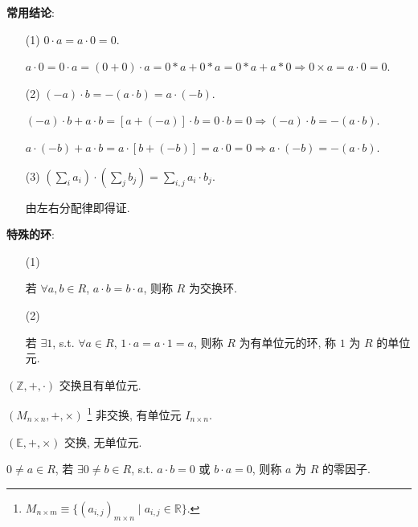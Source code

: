 \documentclass{note}
\begin{document}
\textbf{常用结论}:
\begin{itemize}
    \item[(1)] $0\cdot a=a\cdot 0=0$.
    \begin{pf}
        $a\cdot 0=0\cdot a=(0+0)\cdot a=0*a+0*a=0*a+a*0\Longrightarrow 0\times a=a\cdot 0=0$.
    \end{pf}
    \item[(2)] $(-a)\cdot b=-(a\cdot b)=a\cdot(-b)$.
    \begin{pf}
        $(-a)\cdot b+a\cdot b=[a+(-a)]\cdot b=0\cdot b=0\Longrightarrow (-a)\cdot b=-(a\cdot b)$.

        $a\cdot(-b)+a\cdot b=a\cdot[b+(-b)]=a\cdot 0=0\Longrightarrow a\cdot(-b)=-(a\cdot b)$.
    \end{pf}
    \item[(3)] $\left(\sum_ia_i\right)\cdot\left(\sum_jb_j\right)=\sum_{i,j}a_i\cdot b_j$.
    \begin{pf}
        由左右分配律即得证.
    \end{pf}
\end{itemize}

\textbf{特殊的环}:
\begin{itemize}
    \item[(1)] ~\begin{df}[交换环]
        若 $\forall a,b\in R$, $a\cdot b=b\cdot a$, 则称 $R$ 为交换环.
    \end{df}
    \item[(2)] ~\begin{df}[有单位元的环]
        若 $\exists 1$, s.t. $\forall a\in R$, $1\cdot a=a\cdot 1=a$, 则称 $R$ 为有单位元的环, 称 $1$ 为 $R$ 的单位元.
    \end{df}
\end{itemize}

\begin{eg}
    $(\mathbb{Z},+,\cdot)$ 交换且有单位元.
\end{eg}

\begin{eg}
    $(M_{n\times n},+,\times)$ \footnote{$M_{n\times m}\equiv\{(a_{i,j})_{m\times n}\mid a_{i,j}\in\mathbb{R}\}$.} 非交换, 有单位元 $I_{n\times n}$.
\end{eg}

\begin{eg}
    $(\mathbb{E},+,\times)$ 交换, 无单位元.
\end{eg}

\begin{df}[零因子]
    $0\neq a\in R$, 若 $\exists 0\neq b\in R$, s.t. $a\cdot b=0$ 或 $b\cdot a=0$, 则称 $a$ 为 $R$ 的零因子.
\end{df}
\end{document}
